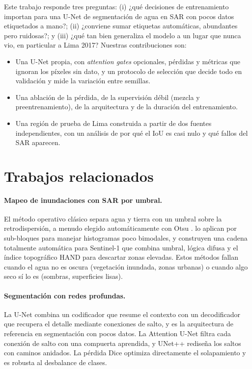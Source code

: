 \documentclass{article}
\begin{document}
Este trabajo responde tres preguntas:
(i) ¿qué decisiones de entrenamiento importan para una U-Net de segmentación de agua en SAR con pocos datos etiquetados a mano?;
(ii) ¿conviene sumar etiquetas automáticas, abundantes pero ruidosas?; y
(iii) ¿qué tan bien generaliza el modelo a un lugar que nunca vio, en particular a Lima 2017?
Nuestras contribuciones son:
\begin{itemize}
  \item Una U-Net propia, con \emph{attention gates} opcionales, pérdidas y métricas que ignoran los píxeles sin dato, y un protocolo de selección que decide todo en validación y mide la variación entre semillas.
  \item Una ablación de la pérdida, de la supervisión débil (mezcla y preentrenamiento), de la arquitectura y de la duración del entrenamiento.
  \item Una región de prueba de Lima construida a partir de dos fuentes independientes, con un análisis de por qué el IoU es casi nulo y qué fallos del SAR aparecen.
\end{itemize}

\section{Trabajos relacionados}

\paragraph{Mapeo de inundaciones con SAR por umbral.}
El método operativo clásico separa agua y tierra con un umbral sobre la retrodispersión, a menudo elegido automáticamente con Otsu \citep{otsu1979}. \citet{martinis2009} lo aplican por sub-bloques para manejar histogramas poco bimodales, y \citet{twele2016} construyen una cadena totalmente automática para Sentinel-1 que combina umbral, lógica difusa y el índice topográfico HAND \citep{nobre2011} para descartar zonas elevadas. Estos métodos fallan cuando el agua no es oscura (vegetación inundada, zonas urbanas) o cuando algo seco sí lo es (sombras, superficies lisas).

\paragraph{Segmentación con redes profundas.}
La U-Net \citep{ronneberger2015} combina un codificador que resume el contexto con un decodificador que recupera el detalle mediante conexiones de salto, y es la arquitectura de referencia en segmentación con pocos datos. La Attention U-Net \citep{oktay2018} filtra cada conexión de salto con una compuerta aprendida, y UNet++ \citep{zhou2018} rediseña los saltos con caminos anidados. La pérdida Dice \citep{milletari2016} optimiza directamente el solapamiento y es robusta al desbalance de clases.
\end{document}

